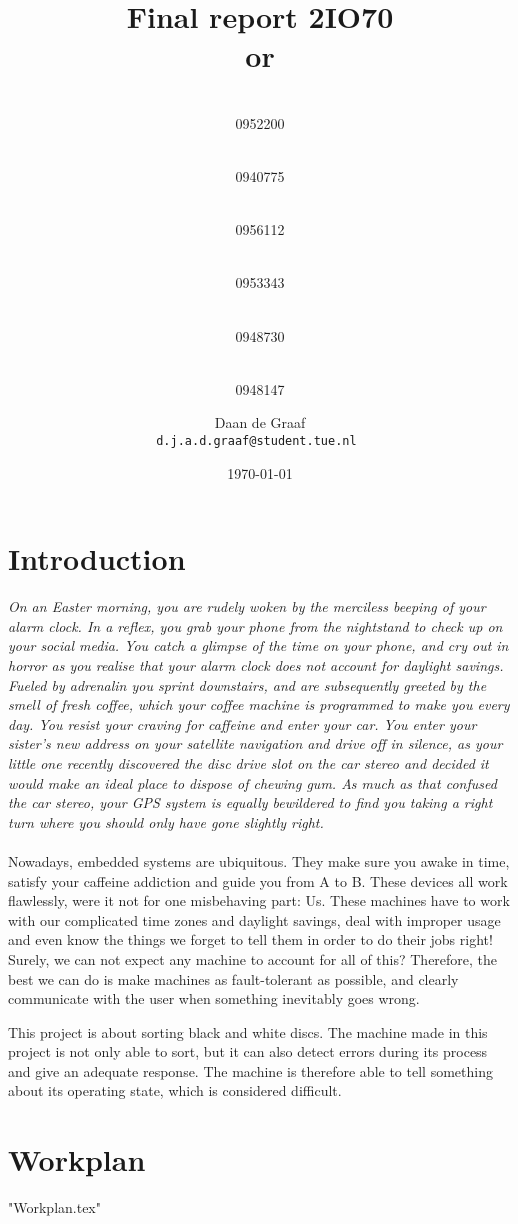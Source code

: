 \documentclass[a4paper,oneside,11pt]{report}
\title{\vspace{-\baselineskip}\sffamily\bfseries \Huge{ Final report 2IO70}
\small \\or \naam
}
\author{
	\makebox[.25\linewidth]{Sergio van Amerongen}\\0952200 \and
	\makebox[.25\linewidth]{Stefan Cloudt}\\0940775 \and
	\makebox[.25\linewidth]{Daan de Graaf}\\0956112 \and
	\makebox[.25\linewidth]{Robert van Lente}\\0953343 \and
	\makebox[.25\linewidth]{Tom Peters}\\0948730 \and
	\makebox[.25\linewidth]{Berrie Trippe}\\0948147 
	\and \makebox[.75\linewidth]{\textbf{Responsible:}} \and
	Daan de Graaf\\ \tt{d.j.a.d.graaf@student.tue.nl}
}
\date{\today}
\begin{document}
\maketitle

\tableofcontents

\chapter{Introduction}
\textit{
On an Easter morning, you are rudely woken by the merciless beeping of your alarm clock. In a reflex, you grab your phone from the nightstand to check up on your social media. You catch a glimpse of the time on your phone, and cry out in horror as you realise that your alarm clock does not account for daylight savings. Fueled by adrenalin you sprint downstairs, and are subsequently greeted by the smell of fresh coffee, which your coffee machine is programmed to make you every day. You resist your craving for caffeine and enter your car. You enter your sister's new address on your satellite navigation and drive off in silence, as your little one recently discovered the disc drive slot on the car stereo and decided it would make an ideal place to dispose of chewing gum. As much as that confused the car stereo, your GPS system is equally bewildered to find you taking a right turn where you should only have gone slightly right.
}
\\\\
Nowadays, embedded systems are ubiquitous. They make sure you awake in time, satisfy your caffeine addiction and guide you from A to B. These devices all work flawlessly, were it not for one misbehaving part: Us. These machines have to work with our complicated time zones and daylight savings, deal with improper usage and even know the things we forget to tell them in order to do their jobs right! Surely, we can not expect any machine to account for all of this? Therefore, the best we can do is make machines as fault-tolerant as possible, and clearly communicate with the user when something inevitably goes wrong.

This project is about sorting black and white discs. The machine made in this project is not only able to sort, but it can also detect errors during its process and give an adequate response. The machine is therefore able to tell something about its operating state, which is considered difficult.

\chapter{Workplan}
{"Workplan.tex"}
\end{document}
